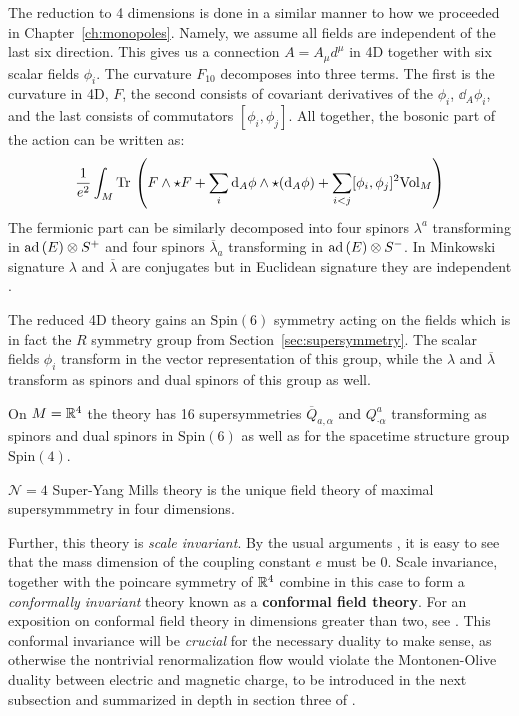 The reduction to 4 dimensions is done in a similar manner to how we proceeded in Chapter~\ref{ch:monopoles}. Namely, we assume all fields are independent of the last six direction. This gives us a connection $A =A_\mu d^\mu$ in 4D together with six scalar fields $\phi_i$. The curvature $F_{10}$ decomposes into three terms. The first is the curvature in 4D, $F$, the second consists of covariant derivatives of the $\phi_i$, $\dd_A \phi_i$, and the last consists of commutators $[\phi_i, \phi_j]$. All together, the bosonic part of the action can be written as:
\begin{equation}
	\frac{1}{e^2} \int_M \mathrm{Tr}\,\left( F \wedge \star F + \sum_i \mathrm{d}_A \phi \wedge \star (\mathrm{d}_A \phi) +  \sum_{i < j} [\phi_i, \phi_j]^2 \mathrm{Vol}_M \right)
\end{equation}
The fermionic part can be similarly decomposed into four spinors $\lambda^a$ transforming in $\mathrm{ad}\,(E) \otimes S^+$ and four spinors $\overline \lambda_a$ transforming in $\mathrm{ad}\,(E) \otimes S^-$. In Minkowski signature $\lambda$ and $\overline \lambda$ are conjugates but in Euclidean signature they are independent \cite{kapustin2008}.

The reduced 4D theory gains an $\mathrm{Spin}(6)$ symmetry acting on the fields which is in fact the $R$ symmetry group from Section~\ref{sec:supersymmetry}. The scalar fields $\phi_i$ transform in the vector representation of this group, while the $\lambda$ and $\overline \lambda$ transform as spinors and dual spinors of this group as well.

On $M=\mathbb{R}^4$ the theory has 16 supersymmetries $\overline Q_{a, \alpha}$ and $Q^a_{\cdot \alpha}$ transforming as spinors and dual spinors in $\mathrm{Spin}(6)$ as well as for the spacetime structure group $\mathrm{Spin}(4)$.


\begin{phys}
	$\mathcal N=4$ Super-Yang Mills theory is the unique field theory of maximal supersymmmetry in four dimensions.
\end{phys}

Further, this theory is \emph{scale invariant}. By the usual arguments \cite{schwartz2014}, it is easy to see that the mass dimension of the coupling constant $e$ must be 0. Scale invariance, together with the poincare symmetry of $\mathbb{R}^4$ combine in this case to form a \emph{conformally invariant} theory known as a \textbf{conformal field theory}. For an exposition on conformal field theory in dimensions greater than two, see \cite{simmons2016}. This conformal invariance will be \emph{crucial} for the necessary duality to make sense, as otherwise the nontrivial renormalization flow would violate the Montonen-Olive duality between electric and magnetic charge, to be introduced in the next subsection and summarized in depth in section three of \cite{kapustin2008}.


